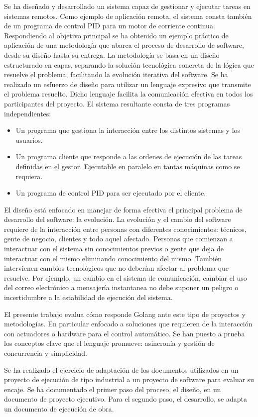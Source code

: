 
Se ha diseñado y desarrollado un sistema capaz de gestionar y ejecutar tareas en sistemas remotos.
Como ejemplo de aplicación remota, el sistema consta también de un programa de control PID para un motor de corriente continua.
Respondiendo al objetivo principal se ha obtenido un ejemplo práctico de aplicación de una metodología que abarca el proceso de desarrollo de software, desde su diseño hasta su entrega.
La metodología se basa en un diseño estructurado en capas, separando la solución tecnológica concreta de la lógica que resuelve el problema, facilitando la evolución iterativa del software.
Se ha realizado un esfuerzo de diseño para utilizar un lenguaje expresivo que transmite el problema resuelto.
Dicho lenguaje facilita la comunicación efectiva en todos los participantes del proyecto.
El sistema resultante consta de tres programas independientes:

\begin{itemize}
    \item Un programa que gestiona la interacción entre los distintos sistemas y los usuarios.
    \item Un programa cliente que responde a las ordenes de ejecución de las tareas definidas en el gestor. Ejecutable en paralelo en tantas máquinas como se requiera.
    \item Un programa de control PID para ser ejecutado por el cliente.
\end{itemize}

El diseño está enfocado en manejar de forma efectiva el principal problema de desarrollo del software: la evolución.
La evolución y el cambio del software requiere de la interacción entre personas con diferentes conocimientos: técnicos, gente de negocio, clientes y todo aquel afectado.
Personas que comienzan a interactuar con el sistema sin conocimientos previos o gente que deja de interactuar con el mismo eliminando conocimiento del mismo.
También intervienen cambios tecnológicos que no deberían afectar al problema que resuelve.
Por ejemplo, un cambio en el sistema de comunicación, cambiar el uso del correo electrónico a mensajería instantanea no debe suponer un peligro o incertidumbre a la estabilidad de ejecución del sistema.

El presente trabajo evalua cómo responde Golang ante este tipo de proyectos y metodologías.
En particular enfocado a soluciones que requieren de la interacción con actuadores o hardware para el control automático.
Se han puesto a prueba los conceptos clave que el lenguaje promueve: asincronía y gestión de concurrencia y simplicidad.

Se ha realizado el ejercicio de adaptación de los documentos utilizados en un proyecto de ejecución de tipo industrial a un proyecto de software para evaluar su encaje.
Se ha documentado el primer paso del proceso, el diseño, en un documento de proyecto ejecutivo.
Para el segundo paso, el desarrollo, se adapta un documento de ejecución de obra.


